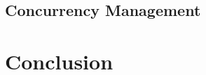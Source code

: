 \documentclass[fleqn]{article}
\begin{document}
\subsection{Concurrency Management}




\section{Conclusion}






\newpage
{\raggedright
}
\end{document}
